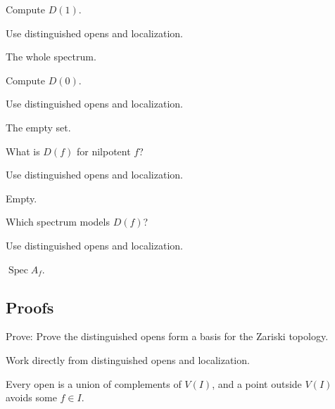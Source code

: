 \begin{exercise}[Unit]\label{exr:vi08-expand-02}
Compute $D(1)$.
\end{exercise}
\begin{hint}
Use distinguished opens and localization.
\end{hint}
\begin{solution}
The whole spectrum.
\end{solution}

\begin{exercise}[Zero]\label{exr:vi08-expand-03}
Compute $D(0)$.
\end{exercise}
\begin{hint}
Use distinguished opens and localization.
\end{hint}
\begin{solution}
The empty set.
\end{solution}

\begin{exercise}[Nilpotent]\label{exr:vi08-expand-04}
What is $D(f)$ for nilpotent $f$?
\end{exercise}
\begin{hint}
Use distinguished opens and localization.
\end{hint}
\begin{solution}
Empty.
\end{solution}

\begin{exercise}[Localization]\label{exr:vi08-expand-05}
Which spectrum models $D(f)$?
\end{exercise}
\begin{hint}
Use distinguished opens and localization.
\end{hint}
\begin{solution}
$\operatorname{Spec}A_f$.
\end{solution}

\subsection*{Proofs}

\begin{exercise}[Basis]\label{exr:vi08-expand-06}
Prove: Prove the distinguished opens form a basis for the Zariski topology.
\end{exercise}
\begin{hint}
Work directly from distinguished opens and localization.
\end{hint}
\begin{solution}
Every open is a union of complements of $V(I)$, and a point outside $V(I)$ avoids some $f\in I$.
\end{solution}

